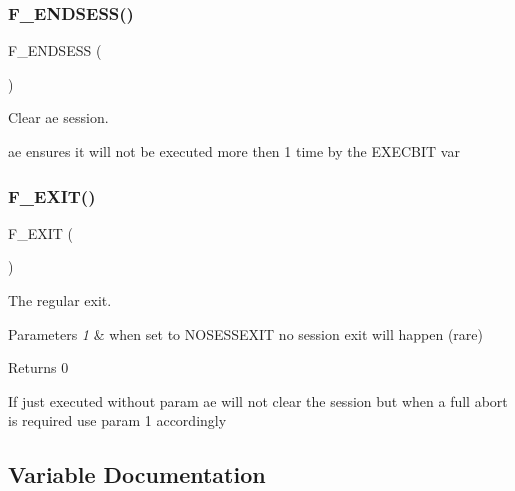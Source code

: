 \subsubsection{\texorpdfstring{F\+\_\+\+E\+N\+D\+S\+E\+S\+S()}{F\_ENDSESS()}}
{\footnotesize\ttfamily F\+\_\+\+E\+N\+D\+S\+E\+SS (\begin{DoxyParamCaption}{ }\end{DoxyParamCaption})}



Clear ae session. 

ae ensures it will not be executed more then 1 time by the E\+X\+E\+C\+B\+IT var \mbox{\label{ansible__engine_8sh_a66ec6201aeab8fa5ad0064b93bd4850c}} 
\subsubsection{\texorpdfstring{F\+\_\+\+E\+X\+I\+T()}{F\_EXIT()}}
{\footnotesize\ttfamily F\+\_\+\+E\+X\+IT (\begin{DoxyParamCaption}\item[{1}]{ }\end{DoxyParamCaption})}



The regular exit. 


\begin{DoxyParams}{Parameters}
{\em 1} & when set to \textquotesingle{}N\+O\+S\+E\+S\+S\+E\+X\+IT\textquotesingle{} no session exit will happen (rare) \\
\hline
\end{DoxyParams}
\begin{DoxyReturn}{Returns}
0
\end{DoxyReturn}
If just executed without param ae will not clear the session but when a full abort is required use param 1 accordingly 

\subsection{Variable Documentation}
\mbox{\label{ansible__engine_8sh_a63fb318d1ba289777a689f021cfb4434}} 

